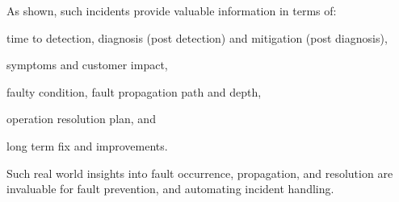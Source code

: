 As shown, such incidents provide valuable information in terms of:
\begin{inparaenum}[(i)]
    \item time to detection, diagnosis (post detection) and mitigation (post diagnosis), 
    \item symptoms and customer impact, 
    \item faulty condition, fault propagation path and depth,
    \item operation resolution plan, and 
    \item long term fix and improvements. 
\end{inparaenum}
Such real world insights into fault occurrence, propagation, and resolution are invaluable for fault prevention, and automating incident handling. 

\begin{table*}


\end{table*}
